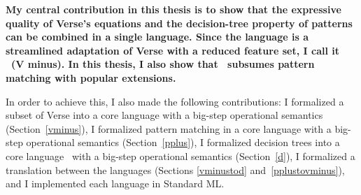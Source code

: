 \documentclass[manuscript,screen,review, 12pt, nonacm]{acmart}
\begin{document}
\bf{My central contribution in this thesis} is to show that the expressive
quality of Verse's equations and the decision-tree property of patterns can be
combined in a single language. Since the language is a streamlined adaptation of
Verse with a reduced feature set, I call it \VMinus\ (V minus). In this thesis,
I also show that \VMinus\ subsumes pattern matching with popular extensions. 

In order to achieve this, I also made the following contributions: I formalized
a subset of Verse into a core language \VMinus with a big-step operational
semantics (Section~\ref{vminus}), I formalized pattern matching in a core
language \PPlus with a big-step operational semantics (Section~\ref{pplus}), I
formalized decision trees into a core language \D\ with a big-step operational
semantics (Section~\ref{d}), I formalized a translation between the languages
(Sections \ref{vminustod} and~\ref{pplustovminus}), and I implemented each
language in Standard ML. 
\end{document}
